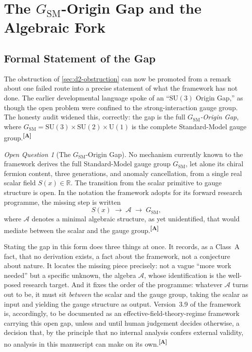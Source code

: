 \documentclass[12pt,a4paper,twoside]{article}
\theoremstyle{plain}
\theoremstyle{definition}
\theoremstyle{remark}
\newtheorem{openquestion}{Open Question}
\newcommand{\catmark}[1]{\textsuperscript{\textsf{\textbf{[#1]}}}}
\begin{document}
\section{The \texorpdfstring{$G_{\mathrm{SM}}$}{G_SM}-Origin Gap and the Algebraic Fork}
\label{sec:algebraic-fork}

\subsection{Formal Statement of the Gap}
\label{subsec:gsm-gap-statement}

The obstruction of \cref{sec:d2-obstruction} can now be promoted from a remark about one failed route into a precise statement of what the framework has not done. The earlier developmental language spoke of an ``$\mathrm{SU}(3)$ Origin Gap,'' as though the open problem were confined to the strong-interaction gauge group. The honesty audit widened this, correctly: the gap is the full \emph{$G_{\mathrm{SM}}$-Origin Gap}, where $G_{\mathrm{SM}} = \mathrm{SU}(3)\times\mathrm{SU}(2)\times\mathrm{U}(1)$ is the complete Standard-Model gauge group.\catmark{A}

\begin{openquestion}[The $G_{\mathrm{SM}}$-Origin Gap]
\label{oq:gsm-gap}
No mechanism currently known to the framework derives the full Standard-Model gauge group $G_{\mathrm{SM}}$, let alone its chiral fermion content, three generations, and anomaly cancellation, from a single real scalar field $S(x)\in\mathbb{R}$. The transition from the scalar primitive to gauge structure is open. In the notation the framework adopts for its forward research programme, the missing step is written
\[
 S(x) \;\longrightarrow\; \mathcal{A} \;\longrightarrow\; G_{\mathrm{SM}},
\]
where $\mathcal{A}$ denotes a minimal algebraic structure, as yet unidentified, that would mediate between the scalar and the gauge group.\catmark{A}
\end{openquestion}

\noindent Stating the gap in this form does three things at once. It records, as a Class~A fact, that no derivation exists, a fact about the framework, not a conjecture about nature. It locates the missing piece precisely: not a vague ``more work needed'' but a specific unknown, the algebra $\mathcal{A}$, whose identification is the well-posed research target. And it fixes the order of the programme: whatever $\mathcal{A}$ turns out to be, it must sit \emph{between} the scalar and the gauge group, taking the scalar as input and yielding the gauge structure as output. Version~3.9 of the framework is, accordingly, to be documented as an effective-field-theory-regime framework carrying this open gap, unless and until human judgement decides otherwise, a decision that, by the principle that no internal analysis confers external validity, no analysis in this manuscript can make on its own.\catmark{A}
\end{document}
